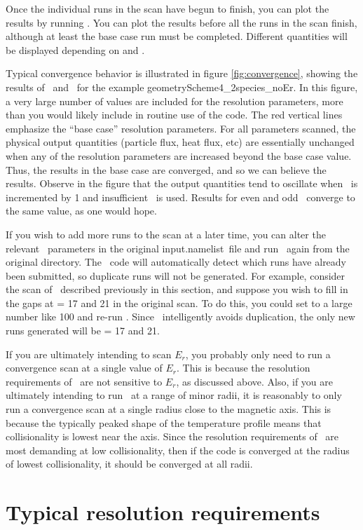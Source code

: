 Once the individual runs in the scan have begun to finish, you can plot the results by running \sfincsScanPlot.
You can plot the results before all the runs in the scan finish, although at least the base case
run must be completed.  Different quantities will be displayed depending on
 and .

Typical convergence behavior is illustrated in figure \ref{fig:convergence},
showing the results of \sfincsScan~and \sfincsScanPlot~for the example
{\ttfamily geometryScheme4\_2species\_noEr}.
In this figure, a very large number of values are included for the resolution
parameters, more than you would likely include in routine use of the code.
The red vertical lines emphasize the ``base case'' resolution parameters.
For all parameters scanned, the physical output quantities (particle flux, heat flux, etc)
are essentially unchanged when any of the resolution parameters
are increased beyond the base case value.  Thus, the results in the base case are converged,
and so we can believe the results.
Observe in the figure that the output quantities tend to oscillate when \Nxi~is incremented by 1 and insufficient
\Nxi~is used. Results for even and odd \Nxi~converge to the same value, as one would hope.


If you wish to add more runs to the scan at a later time,
you can alter the relevant \sfincsScan~parameters in the original {\ttfamily input.namelist}~file
and run \sfincsScan~again from the original directory.  The \sfincsScan~code will automatically detect which runs
have already been submitted, so duplicate runs will not be generated.
For example, consider the scan of \Ntheta~described previously in this section,
and suppose you wish to fill in the gaps at \Ntheta = 17 and 21 in the original scan.
To do this, you could set  to a large number like 100
and re-run \sfincsScan.  Since \sfincsScan~intelligently avoids duplication,
the only new runs generated will be  \Ntheta = 17 and 21.

If you are ultimately intending to scan $E_r$, you probably only need to run a convergence scan
at a single value of $E_r$.  This is because the resolution requirements of \sfincs~are not sensitive to
$E_r$, as discussed above.
Also, if you are ultimately intending to run \sfincs~at a range of minor radii,
it is reasonably to only run a convergence scan at a single radius close to the magnetic axis.
This is because the typically peaked shape of the temperature profile means that
collisionality is lowest near the axis.  Since the resolution requirements of \sfincs~are most
demanding at low collisionality, then if the code is converged at the radius of lowest collisionality,
it should be converged at all radii.

\section{Typical resolution requirements}
